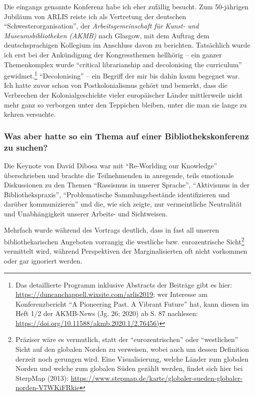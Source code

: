 \documentclass[a4paper,
fontsize=11pt,
oneside,
numbers=noperiodatend,
parskip=half-,
bibliography=totoc,
final
]{scrartcl}
\begin{document}
Die eingangs genannte Konferenz habe ich eher zufällig besucht. Zum
50-jährigen Jubiläum von ARLIS reiste ich als Vertretung der deutschen
\enquote{Schwesterorganisation}, der \emph{Arbeitsgemeinschaft für
Kunst- und Museumsbibliotheken (AKMB)} nach Glasgow, mit dem Auftrag dem
deutschsprachigen Kollegium im Anschluss davon zu berichten. Tatsächlich
wurde ich erst bei der Ankündigung der Kongressthemen hellhörig -- ein
ganzer Themenkomplex wurde \enquote{critical librarianship and
decolonising the curriculum} gewidmet.\footnote{Das detaillierte
  Programm inklusive Abstracts der Beiträge gibt es hier:
  \url{https://duncanchappell.wixsite.com/arlis2019}; wer Interesse am
  Konferenzbericht \enquote{A Pioneering Past. A Vibrant Future} hat,
  kann diesen im Heft 1/2 der AKMB-News (Jg. 26; 2020) ab S. 87
  nachlesen: \url{https://doi.org/10.11588/akmb.2020.1/2.76456)}}
\enquote{Decolonising} -- ein Begriff der mir bis dahin kaum begegnet
war. Ich hatte zuvor schon von Postkolonialismus gehört und bemerkt,
dass die Verbrechen der Kolonialgeschichte vieler europäischer Länder
mittlerweile nicht mehr ganz so verborgen unter den Teppichen bleiben,
unter die man sie lange zu kehren versuchte.

\hypertarget{was-aber-hatte-so-ein-thema-auf-einer-bibliothekskonferenz-zu-suchen}{%
\subsubsection{Was aber hatte so ein Thema auf einer
Bibliothekskonferenz zu
suchen?}\label{was-aber-hatte-so-ein-thema-auf-einer-bibliothekskonferenz-zu-suchen}}

Die Keynote von David Dibosa war mit \enquote{Re-Worlding our Knowledge}
überschrieben und brachte die Teilnehmenden in anregende, teils
emotionale Diskussionen zu den Themen \enquote{Rassismus in unserer
Sprache}, \enquote{Aktivismus in der Bibliothekspraxis},
\enquote{Problematische Sammlungsbestände identifizieren und darüber
kommunizieren} und die, wie sich zeigte, nur vermeintliche Neutralität
und Unabhängigkeit unserer Arbeits- und Sichtweisen.

Mehrfach wurde während des Vortrags deutlich, dass in fast all unseren
bibliothekarischen Angeboten vorrangig die westliche bzw. eurozentrische
Sicht\footnote{Präziser wäre es vermutlich, statt der
  \enquote{eurozentrischen} oder \enquote{westlichen} Sicht auf den
  globalen Norden zu verweisen, wobei auch um dessen Definition derzeit
  noch gerungen wird. Eine Visualisierung, welche Länder zum globalen
  Norden und welche zum globalen Süden gezählt werden, findet sich hier
  bei SterpMap (2013):
  \url{https://www.stepmap.de/karte/globaler-sueden-globaler-norden-V7WKiFRkie}}
vermittelt wird, während Perspektiven der Marginalisierten oft nicht
vorkommen oder gar ignoriert werden.
\end{document}
